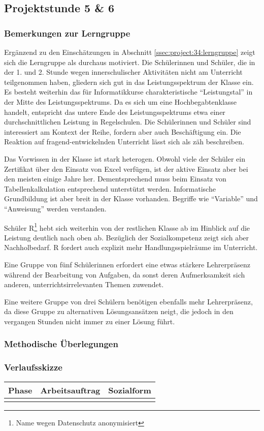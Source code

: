 \subsection{Projektstunde 5 \& 6}\steffen
\subsubsection{Bemerkungen zur Lerngruppe}
Ergänzend zu den Einschätzungen in Abschnitt \ref{ssec:project:34:lerngruppe} zeigt sich die Lerngruppe als durchaus motiviert. Die Schülerinnen und Schüler, die in der 1. und 2. Stunde wegen innerschulischer Aktivitäten nicht am Unterricht teilgenommen haben, gliedern sich gut in das Leistungsspektrum der Klasse ein. Es besteht weiterhin das für Informatikkurse charakteristische ``Leistungstal'' in der Mitte des Leistungsspektrums. Da es sich um eine Hochbegabtenklasse handelt, entspricht das untere Ende des Leistungsspektrums etwa einer durchschnittlichen Leistung in Regelschulen. Die Schülerinnen und Schüler sind interessiert am Kontext der Reihe, fordern aber auch Beschäftigung ein. Die Reaktion auf fragend-entwickelnden Unterricht lässt sich als zäh beschreiben. 

Das Vorwissen in der Klasse ist stark heterogen. Obwohl viele der Schüler ein Zertifikat über den Einsatz von Excel verfügen, ist der aktive Einsatz aber bei den meisten einige Jahre her. Dementsprechend muss beim Einsatz von Tabellenkalkulation entsprechend unterstützt werden. Informatische Grundbildung ist aber breit in der Klasse vorhanden. Begriffe wie ``Variable'' und ``Anweisung'' werden verstanden. 

Schüler R\footnote{Name wegen Datenschutz anonymisiert} hebt sich weiterhin von der restlichen Klasse ab im Hinblick auf die Leistung deutlich nach oben ab. Bezüglich der Sozialkompetenz zeigt sich aber Nachholbedarf. R fordert auch explizit mehr Handlungsspielräume im Unterricht.

Eine Gruppe von fünf Schülerinnen erfordert eine etwas stärkere Lehrerpräsenz während der Bearbeitung von Aufgaben, da sonst deren Aufmerksamkeit sich anderen, unterrichtsirrelevanten Themen zuwendet. 

Eine weitere Gruppe von drei Schülern benötigen ebenfalls mehr Lehrerpräsenz, da diese Gruppe zu alternativen Lösungsansätzen neigt, die jedoch in den vergangen Stunden nicht immer zu einer Lösung führt.
\subsubsection{Methodische Überlegungen}
\begin{landscape}
\subsubsection{Verlaufsskizze}
\noindent
\begin{longtable}{|C{0.3\textwidth}|L{0.8\textwidth}|L{0.4\textwidth}|}
\hline
Phase & Arbeitsauftrag & Sozialform\\
\hline\hline
\endhead
\hline
\endfoot

\end{longtable}
\end{landscape}
